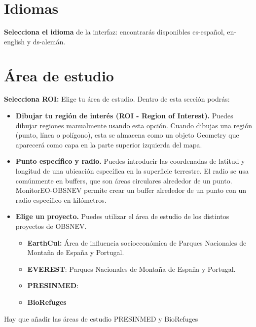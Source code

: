 \documentclass[
]{book}
\providecommand{\tightlist}{%
  \setlength{\itemsep}{0pt}\setlength{\parskip}{0pt}}
\begin{document}
\chapter{Idiomas}\label{idiomas}

\textbf{Selecciona el idioma} de la interfaz: encontrarás disponibles es-español, en-english y ds-alemán.

\chapter{Área de estudio}\label{area-estudio}

\textbf{Selecciona ROI:} Elige tu área de estudio. Dentro de esta sección podrás:

\begin{itemize}
\tightlist
\item
  \textbf{Dibujar tu región de interés (ROI - Region of Interest).} Puedes dibujar regiones manualmente usando esta opción. Cuando dibujas una región (punto, línea o polígono), esta se almacena como un objeto Geometry que aparecerá como capa en la parte superior izquierda del mapa.\\
\item
  \textbf{Punto específico y radio.} Puedes introducir las coordenadas de latitud y longitud de una ubicación específica en la superficie terrestre. El radio se usa comúnmente en buffers, que son áreas circulares alrededor de un punto. MonitorEO-OBSNEV permite crear un buffer alrededor de un punto con un radio específico en kilómetros.\\
\item
  \textbf{Elige un proyecto.} Puedes utilizar el área de estudio de los distintos proyectos de OBSNEV.

  \begin{itemize}
  \tightlist
  \item
    \textbf{EarthCul:} Área de influencia socioeconómica de Parques Nacionales de Montaña de España y Portugal.\\
  \item
    \textbf{EVEREST}: Parques Nacionales de Montaña de España y Portugal.\\
  \item
    \textbf{PRESINMED}:\\
  \item
    \textbf{BioRefuges}
  \end{itemize}
\end{itemize}

Hay que añadir las áreas de estudio PRESINMED y BioRefuges
\end{document}
